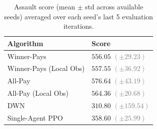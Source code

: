 \begin{table}
  \centering
  \caption{Assault score (mean $\pm$ std across available seeds) averaged over each seed's last 5 evaluation iterations.}
  \begin{tabular}{ll}
    \hline
    {\bf Algorithm} & {\bf Score} \\
    \hline
    Winner-Pays & $556.05$ {\small\textcolor{gray}{$(\pm 29.23)$}} \\
    Winner-Pays (Local Obs) & $557.55$ {\small\textcolor{gray}{$(\pm 36.92)$}} \\
    All-Pay & $576.64$ {\small\textcolor{gray}{$(\pm 43.19)$}} \\
    All-Pay (Local Obs) & $564.36$ {\small\textcolor{gray}{$(\pm 20.68)$}} \\
    DWN & $310.80$ {\small\textcolor{gray}{$(\pm 159.54)$}} \\
    Single-Agent PPO & $358.60$ {\small\textcolor{gray}{$(\pm 25.99)$}} \\
    \hline
  \end{tabular}
  \label{tab:assault_methods}
\end{table}
